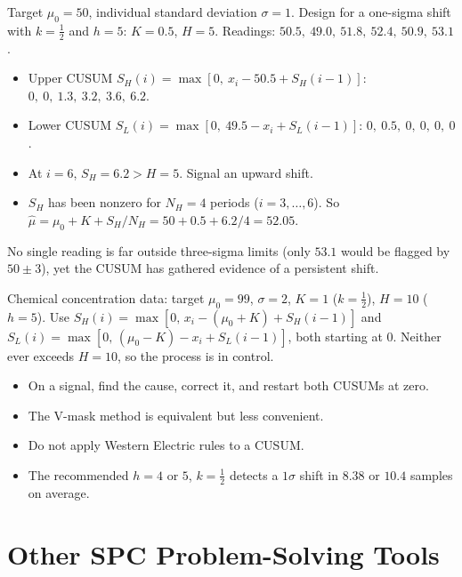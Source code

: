 \begin{example}\label{ex:cusum}
Target $\mu_0=50$, individual standard deviation $\sigma=1$. Design for a one-sigma shift with $k=\tfrac12$ and $h=5$: $K=0.5$, $H=5$. Readings: $50.5,\ 49.0,\ 51.8,\ 52.4,\ 50.9,\ 53.1$.
\begin{itemize}
  \item Upper CUSUM $S_H(i)=\max[0,\ x_i-50.5+S_H(i-1)]$: $0,\ 0,\ 1.3,\ 3.2,\ 3.6,\ 6.2$.
  \item Lower CUSUM $S_L(i)=\max[0,\ 49.5-x_i+S_L(i-1)]$: $0,\ 0.5,\ 0,\ 0,\ 0,\ 0$.
  \item At $i=6$, $S_H=6.2>H=5$. Signal an upward shift.
  \item $S_H$ has been nonzero for $N_H=4$ periods ($i=3,\dots,6$). So $\hat\mu=\mu_0+K+S_H/N_H=50+0.5+6.2/4=52.05$.
\end{itemize}
No single reading is far outside three-sigma limits (only $53.1$ would be flagged by $50\pm3$), yet the CUSUM has gathered evidence of a persistent shift.
\end{example}

\begin{example}
Chemical concentration data: target $\mu_0=99$, $\sigma=2$, $K=1$ ($k=\tfrac12$), $H=10$ ($h=5$). Use $S_H(i)=\max[0,\,x_i-(\mu_0+K)+S_H(i-1)]$ and $S_L(i)=\max[0,\,(\mu_0-K)-x_i+S_L(i-1)]$, both starting at $0$. Neither ever exceeds $H=10$, so the process is in control.
\begin{itemize}
  \item On a signal, find the cause, correct it, and restart both CUSUMs at zero.
  \item The V-mask method is equivalent but less convenient.
  \item Do not apply Western Electric rules to a CUSUM.
  \item The recommended $h=4$ or $5$, $k=\tfrac12$ detects a $1\sigma$ shift in $8.38$ or $10.4$ samples on average.
\end{itemize}
\end{example}

\section{Other SPC Problem-Solving Tools}

